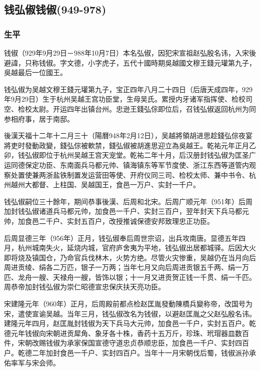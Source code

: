 
\subsection{钱弘俶钱俶\tiny(949-978)}

\subsubsection{生平}

钱俶（929年9月29日－988年10月7日）本名弘俶，因犯宋宣祖赵弘殷名讳，入宋後避諱，只称钱俶。字文德，小字虎子，五代十國時期吳越國文穆王錢元瓘第九子，吳越最后一位國王。

钱弘俶为吴越文穆王錢元瓘第九子，宝正四年八月二十四日（后唐天成四年，929年9月29日）生于杭州吴越王宫功臣堂，生母吴氏。累授内牙诸军指挥使、检校司空、检校太尉。开运四年出镇台州。忠逊王錢弘倧即位后，召钱弘俶返回杭州为同参相府事，居于南邸。

後漢天福十二年十二月三十（陽曆948年2月12日），吴越將領胡进思趁錢弘倧夜宴將吏时發動政變，錢弘倧被軟禁，錢弘俶被胡進思迎立為吳越王。乾祐元年正月乙卯，钱弘俶即位于杭州吴越王宫天宠堂。乾祐二年十月，后汉册封钱弘俶为匡圣广运同德保定功臣、东南面兵马都元帅、镇海镇东等军节度使、浙江东西等道管内观察处置使兼两浙盐铁制置发运营田等使、开府仪同三司、检校太师、兼中书令、杭州越州大都督、上柱国、吴越国王，食邑一万户、实封一千户。

钱弘俶嗣位三十餘年，期间恭事後漢、后周和北宋。后周广顺元年（951年）后周加封钱弘俶诸道兵马都元帅，加食邑一千户、实封三百户，翌年封天下兵马都元帅，加食邑二千户、实封五百户，改授推诚保德安邦致理忠正功臣。

后周显德三年（956年）正月，钱弘俶奉后周世宗诏，出兵攻南唐。显德五年四月，杭州城南失火，延烧内城，官府庐舍夷为平地，钱弘俶出居都城驿。后因大火即将烧及镇国仓，乃命官兵伐林木，火势方绝。尽管火灾惨重，吴越仍在当月向后周进贡绫、绢各二万匹，银子一万两；当年七月又向后周进贡银五千两、绢一万匹、龙舟一艘、天禄舟一艘，皆饰以银；十一月又进贡贺正钱一千贯、绢一千匹。周恭帝加封钱弘俶为崇仁昭德宣忠保庆扶天亮功臣。

宋建隆元年（960年）正月，后周殿前都点检赵匡胤發動陳橋兵變称帝，改国号为宋，遣使宣谕吴越。当年三月，钱弘俶改名为钱俶，以避赵匡胤之父赵弘殷名讳。建隆元年四月，赵匡胤封钱俶为天下兵马大元帅，加食邑一千户，实封五百户。乾德元年钱俶向宋朝进贡犀角、象牙各十株，香药十五万斤，珍珠、玳瑁器皿数百件，宋朝改赐钱俶为承家保国宣德守道忠贞恭顺忠臣，加食邑一千户、实封四百户。乾德二年加封食邑一千户、实封四百户。当年十一月宋朝伐后蜀，钱俶派孙承佑率军与宋会师。

